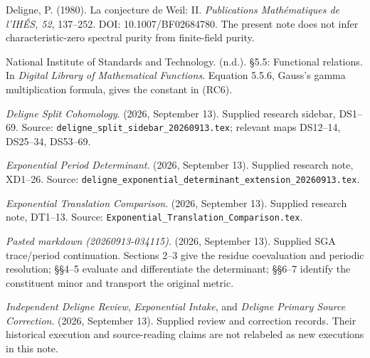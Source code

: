 Deligne, P. (1980). La conjecture de Weil: II. \emph{Publications Mathématiques de l'IHÉS, 52}, 137--252. DOI: 10.1007/BF02684780. The present note does not infer characteristic-zero spectral purity from finite-field purity.

National Institute of Standards and Technology. (n.d.). §5.5: Functional relations. In \emph{Digital Library of Mathematical Functions}. Equation 5.5.6, Gauss's gamma multiplication formula, gives the constant in (RC6).

\emph{Deligne Split Cohomology}. (2026, September 13). Supplied research sidebar, DS1--69. Source: \nolinkurl{deligne_split_sidebar_20260913.tex}; relevant maps DS12--14, DS25--34, DS53--69.

\emph{Exponential Period Determinant}. (2026, September 13). Supplied research note, XD1--26. Source: \nolinkurl{deligne_exponential_determinant_extension_20260913.tex}.

\emph{Exponential Translation Comparison}. (2026, September 13). Supplied research note, DT1--13. Source: \nolinkurl{Exponential_Translation_Comparison.tex}.

\emph{Pasted markdown (20260913-034115)}. (2026, September 13). Supplied SGA trace/period continuation. Sections 2--3 give the residue coevaluation and periodic resolution; §§4--5 evaluate and differentiate the determinant; §§6--7 identify the constituent minor and transport the original metric.

\emph{Independent Deligne Review}, \emph{Exponential Intake}, and \emph{Deligne Primary Source Correction}. (2026, September 13). Supplied review and correction records. Their historical execution and source-reading claims are not relabeled as new executions in this note.
